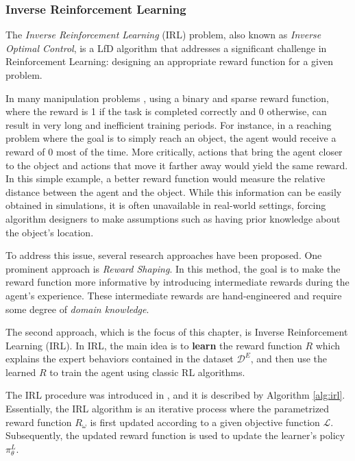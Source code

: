 \subsubsection{Inverse Reinforcement Learning}
\label{sec:irl}
The \textit{Inverse Reinforcement Learning} (IRL) problem, also known as \textit{Inverse Optimal Control}, is a LfD algorithm that addresses a significant challenge in Reinforcement Learning: designing an appropriate reward function for a given problem.

In many manipulation problems \cite{kalashnikov2018scalable}, using a binary and sparse reward function, where the reward is 1 if the task is completed correctly and 0 otherwise, can result in very long and inefficient training periods. For instance, in a reaching problem where the goal is to simply reach an object, the agent would receive a reward of 0 most of the time. More critically, actions that bring the agent closer to the object and actions that move it farther away would yield the same reward. In this simple example, a better reward function would measure the relative distance between the agent and the object. While this information can be easily obtained in simulations, it is often unavailable in real-world settings, forcing algorithm designers to make assumptions such as having prior knowledge about the object's location.

To address this issue, several research approaches have been proposed. One prominent approach is \textit{Reward Shaping}. In this method, the goal is to make the reward function more informative by introducing intermediate rewards during the agent's experience. These intermediate rewards are hand-engineered and require some degree of \textit{domain knowledge}.

The second approach, which is the focus of this chapter, is Inverse Reinforcement Learning (IRL). In IRL, the main idea is to \textbf{learn} the reward function $R$ which explains the expert behaviors contained in the dataset $\mathcal{D}^{E}$, and then use the learned $R$ to train the agent using classic RL algorithms.

The IRL procedure was introduced in \cite{abbeel2004apprenticeship}, and it is described by Algorithm \ref{alg:irl}. Essentially, the IRL algorithm is an iterative process where the parametrized reward function $R_{\omega}$ is first updated according to a given objective function $\mathcal{L}$. Subsequently, the updated reward function is used to update the learner's policy $\pi_{\theta}^{L}$.

